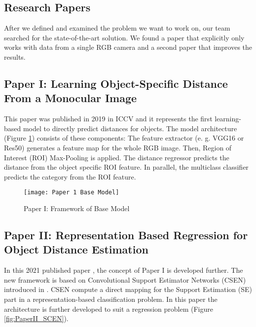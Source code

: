 \documentclass[a4paper, 11pt]{article}
\begin{document}
\begin{multicols}{2}
\section{Research Papers}
\begin{flushleft}
After we defined and examined the problem we want to work on, our team searched for the state-of-the-art solution. We found a paper that explicitly only works with data from a single RGB camera and a second paper that improves the results.
\end{flushleft}
\begin{flushleft}
\subsection{Paper I: Learning Object-Specific Distance From a Monocular Image}
This paper was published in 2019 in ICCV \cite{zhu2019learning} and it represents the first learning-based model to directly predict distances for objects. The model architecture (Figure \ref{fig:PaperI_BaseModel}) consists of these components: The feature extractor (e. g. VGG16 or Res50) generates a feature map for the whole RGB image. Then, Region of Interest (ROI) Max-Pooling is applied. The distance regressor predicts the distance from the object specific ROI feature. In parallel, the multiclass classifier predicts the category from the ROI feature.
\end{flushleft}
\begin{figure}[H]
\centering
\texttt{[image: Paper 1 Base Model]}
\caption{Paper I: Framework of Base Model}
\label{fig:PaperI_BaseModel}
\end{figure}

\subsection{Paper II: Representation Based Regression for Object Distance Estimation}\label{sec:paperII}
\begin{flushleft}
In this 2021 published paper \cite{ahishali2021representation}, the concept of Paper I is developed further. The new framework is based on Convolutional Support Estimator Networks (CSEN) introduced in \cite{CSEN}. CSEN compute a direct mapping for the Support Estimation (SE) part in a representation-based classification problem. In this paper the architecture is further developed to suit a regression problem (Figure \ref{fig:PaperII_SCEN}).


\end{flushleft}
\end{multicols}
\end{document}
